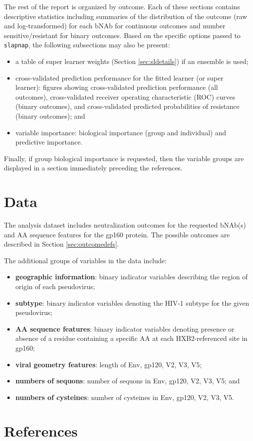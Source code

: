 \documentclass[]{article}
\providecommand{\tightlist}{%
  \setlength{\itemsep}{0pt}\setlength{\parskip}{0pt}}
\begin{document}
The rest of the report is organized by outcome. Each of these sections
contains descriptive statistics including summaries of the distribution
of the outcome (raw and log-transformed) for each bNAb for continuous
outcomes and number sensitive/resistant for binary outcomes. Based on
the specific options passed to \texttt{slapnap}, the following
subsections may also be present:

\begin{itemize}
\tightlist
\item
  a table of super learner weights (Section \ref{sec:sldetails}) if an
  ensemble is used;
\item
  cross-validated prediction performance for the fitted learner (or
  super learner): figures showing cross-validated prediction performance
  (all outcomes), cross-validated receiver operating characteristic
  (ROC) curves (binary outcomes), and cross-validated predicted
  probabilities of resistance (binary outcomes); and
\item
  variable importance: biological importance (group and individual) and
  predictive importance.
\end{itemize}

Finally, if group biological importance is requested, then the variable
groups are displayed in a section immediately preceding the references.

\section{Data}\label{sec:data}

The analysis dataset includes neutralization outcomes for the requested
bNAb(s) and AA sequence features for the gp160 protein. The possible
outcomes are described in Section \ref{sec:outcomedefs}.

The additional groups of variables in the data include:

\begin{itemize}
\tightlist
\item
  \textbf{geographic information}: binary indicator variables describing
  the region of origin of each pseudovirus;
\item
  \textbf{subtype}: binary indicator variables denoting the HIV-1
  subtype for the given pseudovirus;
\item
  \textbf{AA sequence features}: binary indicator variables denoting
  presence or absence of a residue containing a specific AA at each
  HXB2-referenced site in gp160;
\item
  \textbf{viral geometry features}: length of Env, gp120, V2, V3, V5;
\item
  \textbf{numbers of sequons}: number of sequons in Env, gp120, V2, V3,
  V5; and
\item
  \textbf{numbers of cysteines}: number of cysteines in Env, gp120, V2,
  V3, V5.
\end{itemize}

\section{References}\label{sec:refs}


\end{document}
